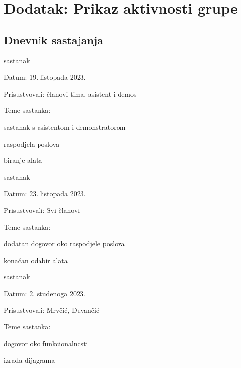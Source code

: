\chapter*{Dodatak: Prikaz aktivnosti grupe}
		
		\section*{Dnevnik sastajanja}
		
		
		
		\begin{packed_enum}
			\item  sastanak
			
			\item[] \begin{packed_item}
				\item Datum: 19. listopada 2023.
				\item Prisustvovali: članovi tima, asistent i demos
				\item Teme sastanka:
				\begin{packed_item}
					\item  sastanak s asistentom i demonstratorom
					\item  raspodjela poslova
					\item  biranje alata
				\end{packed_item}
			\end{packed_item}
			
			\item  sastanak
			\item[] \begin{packed_item}
				\item Datum: 23. listopada 2023.
				\item Prisustvovali: Svi članovi
				\item Teme sastanka:
				\begin{packed_item}
					\item  dodatan dogovor oko raspodjele poslova
					\item  konačan odabir alata
				\end{packed_item}
			\end{packed_item}
			
			\item  sastanak
			\item[] \begin{packed_item}
				\item Datum: 2. studenoga 2023.
				\item Prisustvovali: Mrvčić, Duvančić
				\item Teme sastanka:
				\begin{packed_item}
					\item  dogovor oko funkcionalnosti 
					\item  izrada dijagrama
				\end{packed_item}
			\end{packed_item}
			

\end{packed_enum}
